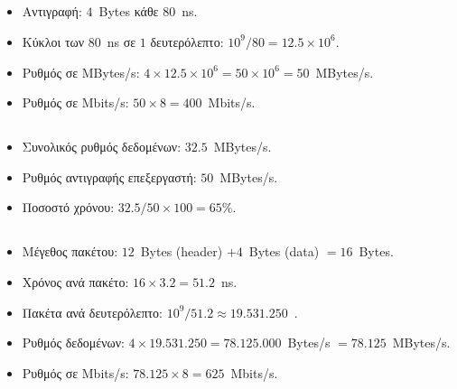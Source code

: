 \documentclass{article}
\begin{document}
\vspace{0.234567cm}

\subsection*{}

\begin{itemize}
    \item Αντιγραφή: $4$~\textlatin{Bytes} κάθε $80$~\textlatin{ns}.
    \item Κύκλοι των $80$~\textlatin{ns} σε $1$ δευτερόλεπτο: ${10^9} / {80} = 12.5 \times 10^6$.
    \item Ρυθμός σε \textlatin{MBytes/s}: $4 \times 12.5 \times 10^6 = 50 \times 10^6 = 50$~\textlatin{MBytes/s}.
    \item Ρυθμός σε \textlatin{Mbits/s}: $50 \times 8 = 400$~\textlatin{Mbits/s}.
\end{itemize}

\subsection*{}

\begin{itemize}
    \item Συνολικός ρυθμός δεδομένων: $32.5$~\textlatin{MBytes/s}.
    \item Ρυθμός αντιγραφής επεξεργαστή: $50$~\textlatin{MBytes/s}.
    \item Ποσοστό χρόνου: ${32.5} / {50} \times 100 = 65\%$.
\end{itemize}



\subsection*{}

\begin{itemize}
    \item Μέγεθος πακέτου: $12$~\textlatin{Bytes (header)} $+ 4$~\textlatin{Bytes (data)} $= 16$~\textlatin{Bytes}.
    \item Χρόνος ανά πακέτο: $16 \times 3.2 = 51.2$~\textlatin{ns}.
    \item Πακέτα ανά δευτερόλεπτο: ${10^9} / {51.2} \approx 19.531.250$~.
    \item Ρυθμός δεδομένων: $4 \times 19.531.250 = 78.125.000$~\textlatin{Bytes/s} $= 78.125$~\textlatin{MBytes/s}.
    \item Ρυθμός σε \textlatin{Mbits/s}: $78.125 \times 8 = 625$~\textlatin{Mbits/s}.
\end{itemize}
\end{document}
